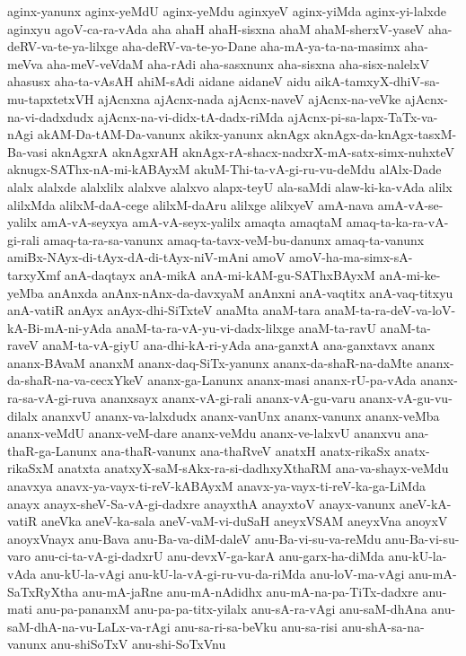 {aginx-yanunx
aginx-yeMdU
aginx-yeMdu
aginxyeV
aginx-yiMda
aginx-yi-lalxde
aginxyu
agoV-ca-ra-vAda
aha
ahaH
ahaH-sisxna
ahaM
ahaM-sherxV-yaseV
aha-deRV-va-te-ya-lilxge
aha-deRV-va-te-yo-Dane
aha-mA-ya-ta-na-masimx
aha-meVva
aha-meV-veVdaM
aha-rAdi
aha-sasxnunx
aha-sisxna
aha-sisx-nalelxV
ahasusx
aha-ta-vAsAH
ahiM-sAdi
aidane
aidaneV
aidu
aikA-tamxyX-dhiV-sa-mu-tapxtetxVH
ajAcnxna
ajAcnx-nada
ajAcnx-naveV
ajAcnx-na-veVke
ajAcnx-na-vi-dadxdudx
ajAcnx-na-vi-didx-tA-dadx-riMda
ajAcnx-pi-sa-lapx-TaTx-va-nAgi
akAM-Da-tAM-Da-vanunx
akikx-yanunx
aknAgx
aknAgx-da-knAgx-tasxM-Ba-vasi
aknAgxrA
aknAgxrAH
aknAgx-rA-shacx-nadxrX-mA-satx-simx-nuhxteV
aknugx-SAThx-nA-mi-kABAyxM
akuM-Thi-ta-vA-gi-ru-vu-deMdu
alAlx-Dade
alalx
alalxde
alalxlilx
alalxve
alalxvo
alapx-teyU
ala-saMdi
alaw-ki-ka-vAda
alilx
alilxMda
alilxM-daA-cege
alilxM-daAru
alilxge
alilxyeV
amA-nava
amA-vA-se-yalilx
amA-vA-seyxya
amA-vA-seyx-yalilx
amaqta
amaqtaM
amaq-ta-ka-ra-vA-gi-rali
amaq-ta-ra-sa-vanunx
amaq-ta-tavx-veM-bu-danunx
amaq-ta-vanunx
amiBx-NAyx-di-tAyx-dA-di-tAyx-niV-mAni
amoV
amoV-ha-ma-simx-sA-tarxyXmf
anA-daqtayx
anA-mikA
anA-mi-kAM-gu-SAThxBAyxM
anA-mi-ke-yeMba
anAnxda
anAnx-nAnx-da-davxyaM
anAnxni
anA-vaqtitx
anA-vaq-titxyu
anA-vatiR
anAyx
anAyx-dhi-SiTxteV
anaMta
anaM-tara
anaM-ta-ra-deV-va-loV-kA-Bi-mA-ni-yAda
anaM-ta-ra-vA-yu-vi-dadx-lilxge
anaM-ta-ravU
anaM-ta-raveV
anaM-ta-vA-giyU
ana-dhi-kA-ri-yAda
ana-ganxtA
ana-ganxtavx
ananx
ananx-BAvaM
ananxM
ananx-daq-SiTx-yanunx
ananx-da-shaR-na-daMte
ananx-da-shaR-na-va-cecxYkeV
ananx-ga-Lanunx
ananx-masi
ananx-rU-pa-vAda
ananx-ra-sa-vA-gi-ruva
ananxsayx
ananx-vA-gi-rali
ananx-vA-gu-varu
ananx-vA-gu-vu-dilalx
ananxvU
ananx-va-lalxdudx
ananx-vanUnx
ananx-vanunx
ananx-veMba
ananx-veMdU
ananx-veM-dare
ananx-veMdu
ananx-ve-lalxvU
ananxvu
ana-thaR-ga-Lanunx
ana-thaR-vanunx
ana-thaRveV
anatxH
anatx-rikaSx
anatx-rikaSxM
anatxta
anatxyX-saM-sAkx-ra-si-dadhxyXthaRM
ana-va-shayx-veMdu
anavxya
anavx-ya-vayx-ti-reV-kABAyxM
anavx-ya-vayx-ti-reV-ka-ga-LiMda
anayx
anayx-sheV-Sa-vA-gi-dadxre
anayxthA
anayxtoV
anayx-vanunx
aneV-kA-vatiR
aneVka
aneV-ka-sala
aneV-vaM-vi-duSaH
aneyxVSAM
aneyxVna
anoyxV
anoyxVnayx
anu-Bava
anu-Ba-va-diM-daleV
anu-Ba-vi-su-va-reMdu
anu-Ba-vi-su-varo
anu-ci-ta-vA-gi-dadxrU
anu-devxV-ga-karA
anu-garx-ha-diMda
anu-kU-la-vAda
anu-kU-la-vAgi
anu-kU-la-vA-gi-ru-vu-da-riMda
anu-loV-ma-vAgi
anu-mA-SaTxRyXtha
anu-mA-jaRne
anu-mA-nAdidhx
anu-mA-na-pa-TiTx-dadxre
anu-mati
anu-pa-pananxM
anu-pa-pa-titx-yilalx
anu-sA-ra-vAgi
anu-saM-dhAna
anu-saM-dhA-na-vu-LaLx-va-rAgi
anu-sa-ri-sa-beVku
anu-sa-risi
anu-shA-sa-na-vanunx
anu-shiSoTxV
anu-shi-SoTxVnu
}
